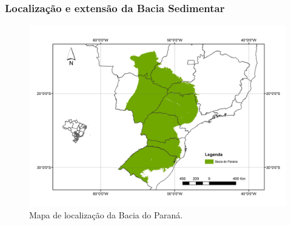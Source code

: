 \documentclass[aspectratio=10]{beamer} %
\begin{document}
\begin{frame}
\frametitle{Localização e extensão da Bacia Sedimentar}
\begin{figure}[H]
\centering
\includegraphics[scale=0.3]{Imagens/BaciaParana.jpg}
\caption{Mapa de localização da Bacia do Paraná. }
\label{mapa geologico}
\end{figure}
\end{frame}















\end{document}
